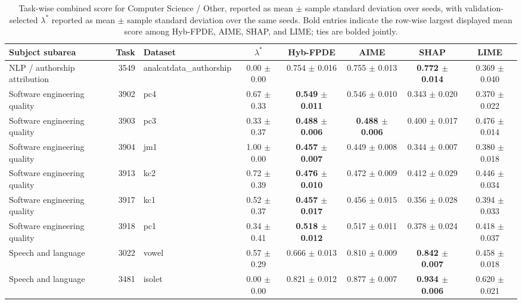 \begin{table}[!tbp]
    \caption{Task-wise combined score for Computer Science / Other, reported as mean $\pm$ sample standard deviation over seeds, with validation-selected $\lambda^*$ reported as mean $\pm$ sample standard deviation over the same seeds. Bold entries indicate the row-wise largest displayed mean score among Hyb-FPDE, AIME, SHAP, and LIME; ties are bolded jointly.}
    \label{tab:taskwise_combined_scores_sd_computer_science_other}
    \centering
    \scriptsize
    \setlength{\tabcolsep}{3pt}
    \renewcommand{\arraystretch}{1.03}
    \begin{tabular}{lrlccccc}
        \toprule
        Subject subarea & Task & Dataset & $\lambda^*$ & Hyb-FPDE & AIME & SHAP & LIME  \\
        \midrule
        NLP / authorship attribution & 3549 & analcatdata\_authorship & 0.00 $\pm$ 0.00 & 0.754 $\pm$ 0.016 & 0.755 $\pm$ 0.013 & \textbf{0.772 $\pm$ 0.014} & 0.369 $\pm$ 0.040 \\
        Software engineering quality & 3902 & pc4 & 0.67 $\pm$ 0.33 & \textbf{0.549 $\pm$ 0.011} & 0.546 $\pm$ 0.010 & 0.343 $\pm$ 0.020 & 0.370 $\pm$ 0.022 \\
        Software engineering quality & 3903 & pc3 & 0.33 $\pm$ 0.37 & \textbf{0.488 $\pm$ 0.006} & \textbf{0.488 $\pm$ 0.006} & 0.400 $\pm$ 0.017 & 0.476 $\pm$ 0.014 \\
        Software engineering quality & 3904 & jm1 & 1.00 $\pm$ 0.00 & \textbf{0.457 $\pm$ 0.007} & 0.449 $\pm$ 0.008 & 0.344 $\pm$ 0.007 & 0.380 $\pm$ 0.018 \\
        Software engineering quality & 3913 & kc2 & 0.72 $\pm$ 0.39 & \textbf{0.476 $\pm$ 0.010} & 0.472 $\pm$ 0.009 & 0.412 $\pm$ 0.029 & 0.446 $\pm$ 0.034 \\
        Software engineering quality & 3917 & kc1 & 0.52 $\pm$ 0.37 & \textbf{0.457 $\pm$ 0.017} & 0.456 $\pm$ 0.015 & 0.356 $\pm$ 0.028 & 0.394 $\pm$ 0.033 \\
        Software engineering quality & 3918 & pc1 & 0.34 $\pm$ 0.41 & \textbf{0.518 $\pm$ 0.012} & 0.517 $\pm$ 0.011 & 0.378 $\pm$ 0.024 & 0.418 $\pm$ 0.037 \\
        Speech and language & 3022 & vowel & 0.57 $\pm$ 0.29 & 0.666 $\pm$ 0.013 & 0.810 $\pm$ 0.009 & \textbf{0.842 $\pm$ 0.007} & 0.458 $\pm$ 0.018 \\
        Speech and language & 3481 & isolet & 0.00 $\pm$ 0.00 & 0.821 $\pm$ 0.012 & 0.877 $\pm$ 0.007 & \textbf{0.934 $\pm$ 0.006} & 0.620 $\pm$ 0.021 \\

\end{tabular}
\end{table}
